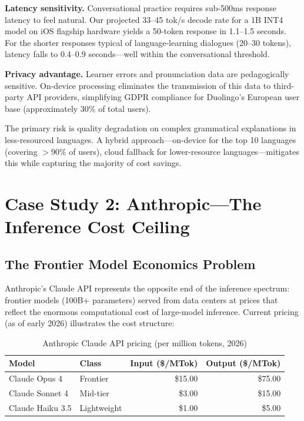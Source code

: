 \documentclass[12pt, letterpaper, twoside]{report}
\begin{document}
\textbf{Latency sensitivity.} Conversational practice requires sub-500ms response latency to feel natural. Our projected 33--45 tok/s decode rate for a 1B INT4 model on iOS flagship hardware yields a 50-token response in 1.1--1.5 seconds. For the shorter responses typical of language-learning dialogues (20--30 tokens), latency falls to 0.4--0.9 seconds---well within the conversational threshold.

\textbf{Privacy advantage.} Learner errors and pronunciation data are pedagogically sensitive. On-device processing eliminates the transmission of this data to third-party API providers, simplifying GDPR compliance for Duolingo's European user base (approximately 30\% of total users).

The primary risk is quality degradation on complex grammatical explanations in less-resourced languages. A hybrid approach---on-device for the top 10 languages (covering $>$90\% of users), cloud fallback for lower-resource languages---mitigates this while capturing the majority of cost savings.

\section{Case Study 2: Anthropic---The Inference Cost Ceiling}
\label{sec:anthropic}

\subsection{The Frontier Model Economics Problem}

Anthropic's Claude API represents the opposite end of the inference spectrum: frontier models (100B+ parameters) served from data centers at prices that reflect the enormous computational cost of large-model inference. Current pricing (as of early 2026) illustrates the cost structure:

\begin{table}[H]
\centering
\caption{Anthropic Claude API pricing (per million tokens, 2026)}
\label{tab:claude_pricing}
{\small
\begin{tabular}{@{}llrr@{}}
\toprule
\textbf{Model} & \textbf{Class} & \textbf{Input (\$/MTok)} & \textbf{Output (\$/MTok)} \\
\midrule
Claude Opus 4 & Frontier & \$15.00 & \$75.00 \\
Claude Sonnet 4 & Mid-tier & \$3.00 & \$15.00 \\
Claude Haiku 3.5 & Lightweight & \$1.00 & \$5.00 \\
\bottomrule
\end{tabular}
}
\end{table}
\end{document}

